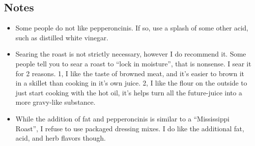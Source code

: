 \begin{multicols}{2}
\subsection*{Notes}
\begin{itemize}
    \item Some people do not like pepperoncinis. If so, use a splash of some other acid, such as distilled white vinegar.
    \item Searing the roast is not strictly necessary, however I do recommend it. Some people tell you to sear a roast to “lock in moisture”, that is nonsense. I sear it for 2 reasons. 1, I like the taste of browned meat, and it’s easier to brown it in a skillet than cooking in it’s own juice. 2, I like the flour on the outside to just start cooking with the hot oil, it’s helps turn all the future-juice into a more gravy-like substance.
    \item While the addition of fat and pepperoncinis is similar to a “Mississippi Roast”, I refuse to use packaged dressing mixes. I do like the additional fat, acid, and herb flavors though.
\end{itemize}
\end{multicols}
\clearpage